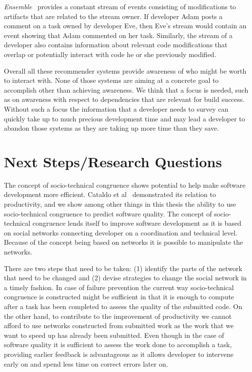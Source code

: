 \emph{Ensemble}~\cite{xiang:rsse:2008} provides a constant stream of events consisting of modifications to artifacts that are related to the stream owner.
If developer Adam posts a comment on a task owned by developer Eve, then Eve's stream would contain an event showing that Adam commented on her task.
Similarly, the stream of a developer also contains information about relevant code modifications that overlap or potentially interact with code he or she previously modified.


Overall all these recommender systems provide awareness of who might be worth to interact with.
None of those systems are aiming at a concrete goal to accomplish other than achieving awareness.
We think that a focus is needed, such as on awareness with respect to dependencies that are relevant for build success.
Without such a focus the information that a developer needs to survey can quickly take up to much precious development time and may lead a developer to abandon those systems as they are taking up more time than they save.






\section{Next Steps/Research Questions}
The concept of socio-technical congruence shows potential to help make software development more efficient.
Cataldo et al~\cite{cataldo:cscw:2006} demonstrated its relation to productivity, and we show among other things in this thesis the ability to use socio-technical congruence to predict software quality.
The concept of socio-technical congruence lends itself to improve software development as it is based on social networks connecting developer on a coordination and technical level.
Because of the concept being based on networks it is possible to manipulate the networks.

There are two steps that need to be taken:
(1) identify the parts of the network that need to be changed
and (2) devise strategies to change the social network in a timely fashion.
In case of failure prevention the current way socio-technical congruence is constructed might be sufficient in that it is enough to compute after a task has been completed to assess the quality of the submitted code.
On the other hand, to contribute to the improvement of productivity we cannot afford to use networks constructed from submitted work as the work that we want to speed up has already been submitted.
Even though in the case of software quality it is sufficient to assess the work done to accomplish a task, providing earlier feedback is advantageous as it allows developer to intervene early on and spend less time on correct errors later on.

